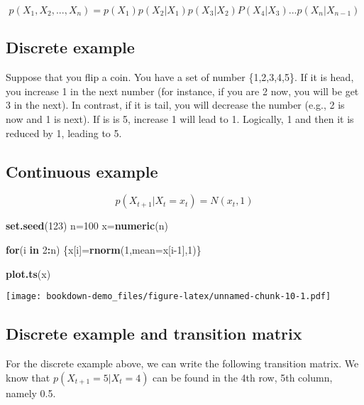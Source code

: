 \documentclass[
]{book}
\newenvironment{Shaded}{\begin{snugshade}}{\end{snugshade}}
\newcommand{\ControlFlowTok}[1]{\textcolor[rgb]{0.13,0.29,0.53}{\textbf{#1}}}
\newcommand{\DataTypeTok}[1]{\textcolor[rgb]{0.13,0.29,0.53}{#1}}
\newcommand{\DecValTok}[1]{\textcolor[rgb]{0.00,0.00,0.81}{#1}}
\newcommand{\KeywordTok}[1]{\textcolor[rgb]{0.13,0.29,0.53}{\textbf{#1}}}
\newcommand{\NormalTok}[1]{#1}
\newcommand{\OperatorTok}[1]{\textcolor[rgb]{0.81,0.36,0.00}{\textbf{#1}}}
\begin{document}
\[p(X_1,X_2,...,X_n)=p(X_1)p(X_2|X_1)p(X_3|X_2)P(X_4|X_3)...p(X_n|X_{n-1})\]

\hypertarget{discrete-example}{%
\subsection{Discrete example}\label{discrete-example}}

Suppose that you flip a coin. You have a set of number \{1,2,3,4,5\}. If it is head, you increase 1 in the next number (for instance, if you are 2 now, you will be get 3 in the next). In contrast, if it is tail, you will decrease the number (e.g., 2 is now and 1 is next). If is is 5, increase 1 will lead to 1. Logically, 1 and then it is reduced by 1, leading to 5.

\hypertarget{continuous-example}{%
\subsection{Continuous example}\label{continuous-example}}

\[p(X_{t+1}| X_t=x_t)=N(x_t,1)\]

\begin{Shaded}
\begin{Highlighting}[]
\KeywordTok{set.seed}\NormalTok{(}\DecValTok{123}\NormalTok{)}
\NormalTok{n=}\DecValTok{100}
\NormalTok{x=}\KeywordTok{numeric}\NormalTok{(n)}

\ControlFlowTok{for}\NormalTok{(i }\ControlFlowTok{in} \DecValTok{2}\OperatorTok{:}\NormalTok{n)}
\NormalTok{\{x[i]=}\KeywordTok{rnorm}\NormalTok{(}\DecValTok{1}\NormalTok{,}\DataTypeTok{mean=}\NormalTok{x[i}\DecValTok{-1}\NormalTok{],}\DecValTok{1}\NormalTok{)\}}

\KeywordTok{plot.ts}\NormalTok{(x)}
\end{Highlighting}
\end{Shaded}

\texttt{[image: bookdown-demo\_files/figure-latex/unnamed-chunk-10-1.pdf]}

\hypertarget{discrete-example-and-transition-matrix}{%
\subsection{Discrete example and transition matrix}\label{discrete-example-and-transition-matrix}}

For the discrete example above, we can write the following transition matrix. We know that \(p(X_{t+1}=5 | X_t=4)\) can be found in the 4th row, 5th column, namely 0.5.
\end{document}
